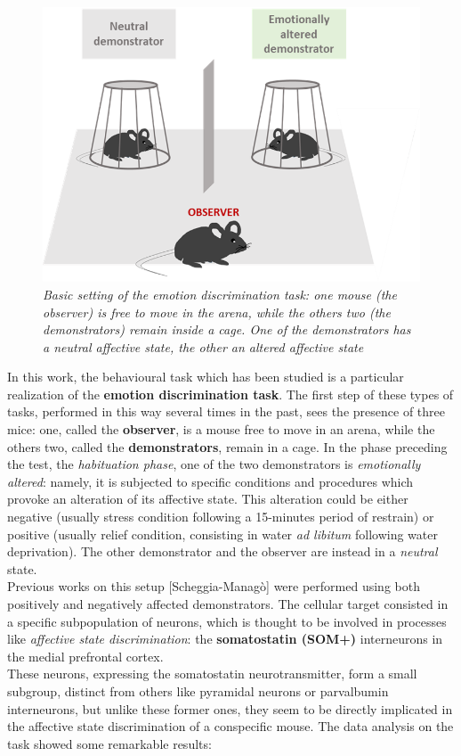 \documentclass[a4paper]{article}
\begin{document}
\begin{figure}
	\begin{center}
		\includegraphics[scale=.60]{mice_task.png} 
	\end{center} 
	\caption{\textit{Basic setting of the emotion discrimination task: one mouse (the \textit{observer}) is free to move in the arena, while the others two (the \textit{demonstrators}) remain inside a cage. One of the demonstrators has a neutral affective state, the other an altered affective state}}
	
\end{figure}
In this work, the behavioural task which has been studied is a particular realization of the \textbf{emotion discrimination task}. The first step of these types of tasks, performed in this way several times in the past, sees the presence of three mice: one, called the \textbf{observer}, is a mouse free to move in an arena, while the others two, called the \textbf{demonstrators}, remain in a cage. In the phase preceding the test, the \textit{habituation phase}, one of the two demonstrators is \textit{emotionally altered}: namely, it is subjected to specific conditions and procedures which provoke an alteration of its affective state. This alteration could be either negative (usually stress condition following a 15-minutes period of restrain) or positive (usually relief condition, consisting in water \textit{ad libitum} following water deprivation). The other demonstrator and the observer are instead in a \textit{neutral} state.\\

Previous works on this setup [Scheggia-Managò] were performed using both positively and negatively affected demonstrators. The cellular target consisted in a specific subpopulation of neurons, which is thought to be involved in processes like \textit{affective state discrimination}: the \textbf{somatostatin (SOM+)} interneurons in the medial prefrontal cortex.\\
These neurons, expressing the somatostatin neurotransmitter, form a small
subgroup, distinct from others like pyramidal neurons or parvalbumin interneurons, but unlike these former ones, they seem to be directly implicated in the affective state discrimination of a conspecific mouse. The data analysis on the task showed some remarkable results:
\end{document}

